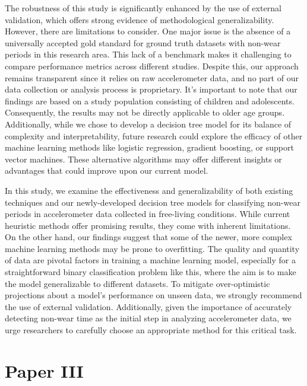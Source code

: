 \documentclass[
  10pt,
]{scrbook}
\begin{document}
The robustness of this study is significantly enhanced by the use of
external validation, which offers strong evidence of methodological
generalizability. However, there are limitations to consider. One major
issue is the absence of a universally accepted gold standard for ground
truth datasets with non-wear periods in this research area. This lack of
a benchmark makes it challenging to compare performance metrics across
different studies. Despite this, our approach remains transparent since
it relies on raw accelerometer data, and no part of our data collection
or analysis process is proprietary. It's important to note that our
findings are based on a study population consisting of children and
adolescents. Consequently, the results may not be directly applicable to
older age groups. Additionally, while we chose to develop a decision
tree model for its balance of complexity and interpretability, future
research could explore the efficacy of other machine learning methods
like logistic regression, gradient boosting, or support vector machines.
These alternative algorithms may offer different insights or advantages
that could improve upon our current model.

In this study, we examine the effectiveness and generalizability of both
existing techniques and our newly-developed decision tree models for
classifying non-wear periods in accelerometer data collected in
free-living conditions. While current heuristic methods offer promising
results, they come with inherent limitations. On the other hand, our
findings suggest that some of the newer, more complex machine learning
methods may be prone to overfitting. The quality and quantity of data
are pivotal factors in training a machine learning model, especially for
a straightforward binary classification problem like this, where the aim
is to make the model generalizable to different datasets. To mitigate
over-optimistic projections about a model's performance on unseen data,
we strongly recommend the use of external validation. Additionally,
given the importance of accurately detecting non-wear time as the
initial step in analyzing accelerometer data, we urge researchers to
carefully choose an appropriate method for this critical task.

\hypertarget{paper-iii}{%
\section{Paper III}\label{paper-iii}}
\end{document}

